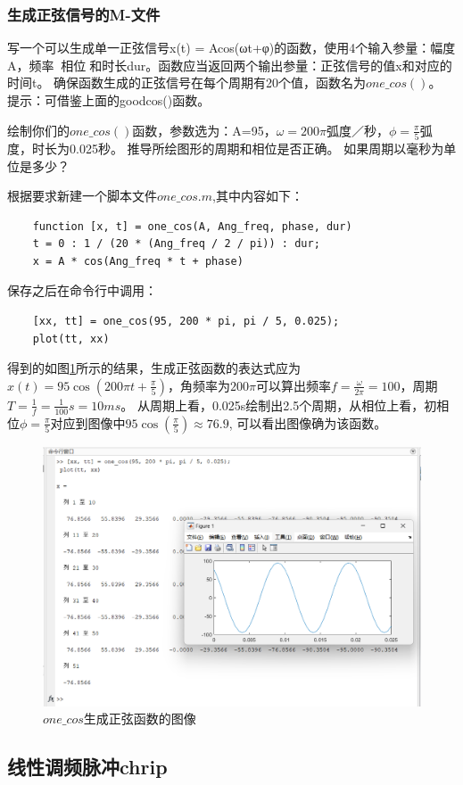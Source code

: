 \documentclass[UTF8]{ctexart}
\begin{document}
\subsubsection{生成正弦信号的M-文件}
\begin{framed}
    写一个可以生成单一正弦信号x(t) = Acos(ωt+φ)的函数，使用4个输入参量：幅度A，频率，相位和时长dur。函数应当返回两个输出参量：正弦信号的值x和对应的时间t。
    确保函数生成的正弦信号在每个周期有20个值，函数名为$one\_cos()$。
    提示：可借鉴上面的goodcos()函数。

    绘制你们的$one\_cos()$函数，参数选为：A=95，$\omega =200\pi$弧度／秒，$\phi =\frac{\pi}{5} $弧度，时长为0.025秒。
    推导所绘图形的周期和相位是否正确。
    如果周期以毫秒为单位是多少？
\end{framed}
根据要求新建一个脚本文件$one\_cos.m$,其中内容如下：
\begin{verbatim}
    function [x, t] = one_cos(A, Ang_freq, phase, dur)
    t = 0 : 1 / (20 * (Ang_freq / 2 / pi)) : dur;
    x = A * cos(Ang_freq * t + phase)
\end{verbatim}
保存之后在命令行中调用：
\begin{verbatim}
    [xx, tt] = one_cos(95, 200 * pi, pi / 5, 0.025);
    plot(tt, xx)
\end{verbatim}
得到的如图\ref{img:one_cos}所示的结果，生成正弦函数的表达式应为$x(t)=95\cos(200\pi t+\frac{\pi}{5})$，角频率为$200\pi$可以算出频率$f=\frac{\omega}{2\pi}=100$，周期$T=\frac{1}{f}=\frac{1}{100}s=10ms$。
从周期上看，0.025s绘制出2.5个周期，从相位上看，初相位$\phi=\frac{\pi}{5}$对应到图像中$95\cos(\frac{\pi}{5})\approx 76.9$,
可以看出图像确为该函数。
\begin{figure}[htbp]
    \centering
    \includegraphics[width=0.7\linewidth]{one_cos.png}
    \caption{$one\_cos$生成正弦函数的图像}
    \label{img:one_cos}
\end{figure}

\subsection{线性调频脉冲chrip}
\end{document}
